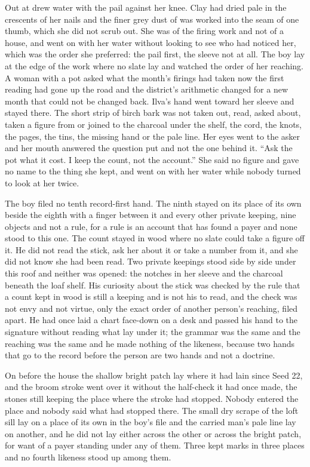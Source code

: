 Out at   drew water with the pail against her knee. Clay had dried pale in the crescents of her nails and the finer grey dust of  was worked into the seam of one thumb, which she did not scrub out. She was of the firing work and not of a house, and went on with her water without looking to see who had noticed her, which was the order she preferred: the pail first, the sleeve not at all. The boy lay at the edge of the work where no slate lay and watched the order of her reaching. A woman with a pot asked what the month's firings had taken now the first reading had gone up the road and the district's arithmetic changed for a new month that could not be changed back. Ilva's hand went toward her sleeve and stayed there. The short strip of birch bark was not taken out, read, asked about, taken a figure from or joined to the charcoal under the shelf, the cord, the knots, the pages, the tins, the missing hand or the pale line. Her eyes went to the asker and her mouth answered the question put and not the one behind it. “Ask the pot what it cost. I keep the count, not the account.” She said no figure and gave no name to the thing she kept, and went on with her water while nobody turned to look at her twice.

The boy filed no tenth record-first hand. The ninth stayed on its place of its own beside the eighth with a finger between it and every other private keeping, nine objects and not a rule, for a rule is an account that has found a payer and none stood to this one. The count stayed in wood where no slate could take a figure off it. He did not read the stick, ask her about it or take a number from it, and she did not know she had been read. Two private keepings stood side by side under this roof and neither was opened: the notches in her sleeve and the charcoal beneath the loaf shelf. His curiosity about the stick was checked by the rule that a count kept in wood is still a keeping and is not his to read, and the check was not envy and not virtue, only the exact order of another person's reaching, filed apart. He had once laid a chart face-down on a desk and passed his hand to the signature without reading what lay under it; the grammar was the same and the reaching was the same and he made nothing of the likeness, because two hands that go to the record before the person are two hands and not a doctrine.

On  before the house the shallow bright patch lay where it had lain since Seed 22, and the broom stroke went over it without the half-check it had once made, the stones still keeping the place where the stroke had stopped. Nobody entered the place and nobody said what had stopped there. The small dry scrape of the loft sill lay on a place of its own in the boy's file and the carried man's pale line lay on another, and he did not lay either across the other or across the bright patch, for want of a payer standing under any of them. Three kept marks in three places and no fourth likeness stood up among them.

